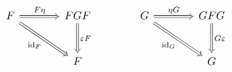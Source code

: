 \documentclass[border=6pt]{standalone}
\newcommand{\id}{\mathrm{id}}
\begin{document}
$
\begin{tikzcd}[column sep=large, row sep=large]
  F \arrow[r, Rightarrow, "F\eta"] \arrow[dr, Rightarrow, "\id_F"'] & FGF \arrow[d, Rightarrow, "\varepsilon F"] &
  G \arrow[r, Rightarrow, "\eta G"] \arrow[dr, Rightarrow, "\id_G"'] & GFG \arrow[d, Rightarrow, "G\varepsilon"] \\
   & F & & G
\end{tikzcd}
$
\end{document}
